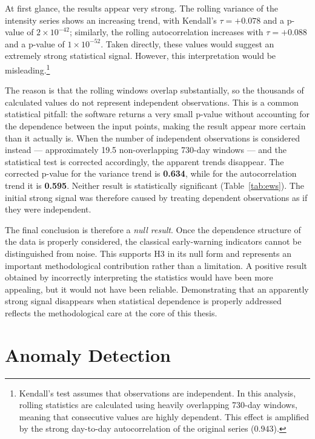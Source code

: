 At first glance, the results appear very strong. The rolling variance of the intensity series shows an increasing trend, with Kendall's $\tau = +0.078$ and a p-value of $2\times10^{-42}$; similarly, the rolling autocorrelation increases with $\tau = +0.088$ and a p-value of $1\times10^{-52}$. Taken directly, these values would suggest an extremely strong statistical signal. However, this interpretation would be misleading.\footnote{Kendall's test assumes that observations are independent. In this analysis, rolling statistics are calculated using heavily overlapping 730-day windows, meaning that consecutive values are highly dependent. This effect is amplified by the strong day-to-day autocorrelation of the original series ($0.943$).}

The reason is that the rolling windows overlap substantially, so the thousands of calculated values do not represent independent observations. This is a common statistical pitfall: the software returns a very small p-value without accounting for the dependence between the input points, making the result appear more certain than it actually is. When the number of independent observations is considered instead --- approximately 19.5 non-overlapping 730-day windows --- and the statistical test is corrected accordingly, the apparent trends disappear. The corrected p-value for the variance trend is \textbf{0.634}, while for the autocorrelation trend it is \textbf{0.595}. Neither result is statistically significant (Table~\ref{tab:ews}). The initial strong signal was therefore caused by treating dependent observations as if they were independent.




The final conclusion is therefore a \emph{null result}. Once the dependence structure of the data is properly considered, the classical early-warning indicators cannot be distinguished from noise. This supports H3 in its null form and represents an important methodological contribution rather than a limitation. A positive result obtained by incorrectly interpreting the statistics would have been more appealing, but it would not have been reliable. Demonstrating that an apparently strong signal disappears when statistical dependence is properly addressed reflects the methodological care at the core of this thesis.

\section{Anomaly Detection}
\label{sec:detect-anomalies}

